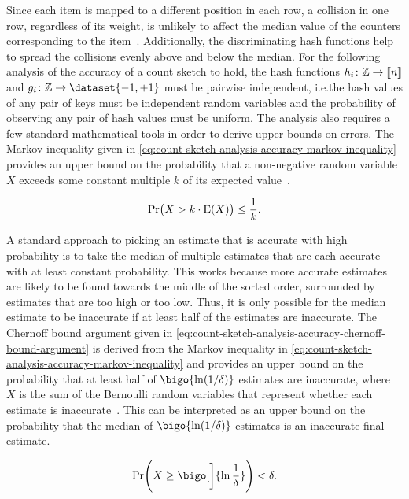 Since each item is mapped to a different position in each row, a collision in one row, regardless of its weight, is unlikely to affect the median value of the counters corresponding to the item~\citep{charikar02,cormode20}.
Additionally, the discriminating hash functions help to spread the collisions evenly above and below the median.
For the following analysis of the accuracy of a count sketch to hold, the hash functions \( h_{i} \colon \mathbb{Z} \to \llbracket n\rrbracket \) and \( g_{i} \colon \integers \to \dataset{-1, +1} \) must be pairwise independent, i.e.\@ the hash values of any pair of keys must be independent random variables and the probability of observing any pair of hash values must be uniform.
The analysis also requires a few standard mathematical tools in order to derive upper bounds on errors.
The Markov inequality given in \cref{eq:count-sketch-analysis-accuracy-markov-inequality} provides an upper bound on the probability that a non-negative random variable \( X \) exceeds some constant multiple \( k \) of its expected value~\citep{mitzenmacher05}.

\begin{equation}
  \label{eq:count-sketch-analysis-accuracy-markov-inequality}
  \operatorname{\Pr} \bigl( X > k \cdot \operatorname{E} (X) \bigr) \leq \frac{1}{k}.
\end{equation}

A standard approach to picking an estimate that is accurate with high probability is to take the median of multiple estimates that are each accurate with at least constant probability.
This works because more accurate estimates are likely to be found towards the middle of the sorted order, surrounded by estimates that are too high or too low.
Thus, it is only possible for the median estimate to be inaccurate if at least half of the estimates are inaccurate.
The Chernoff bound argument given in \cref{eq:count-sketch-analysis-accuracy-chernoff-bound-argument} is derived from the Markov inequality in \cref{eq:count-sketch-analysis-accuracy-markov-inequality} and provides an upper bound on the probability that at least half of \( \bigo{\ln (1 / \delta)} \) estimates are inaccurate, where \( X \) is the sum of the Bernoulli random variables that represent whether each estimate is inaccurate~\citep{mitzenmacher05}.
This can be interpreted as an upper bound on the probability that the median of \( \bigo{\ln (1 / \delta)} \) estimates is an inaccurate final estimate.

\begin{equation}
  \label{eq:count-sketch-analysis-accuracy-chernoff-bound-argument}
  \probability \Biggl( X \geq \bigo[\bigg]{\ln \frac{1}{\delta}} \Biggr) < \delta.
\end{equation}

